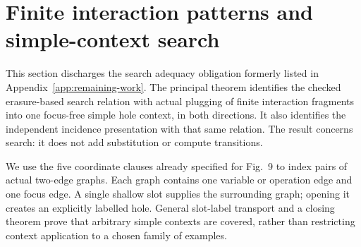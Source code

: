 \section{Finite interaction patterns and simple-context search}
\label{sec:contextual-search}
This section discharges the search adequacy obligation formerly listed in
Appendix~\ref{app:remaining-work}. The principal theorem identifies the checked
erasure-based search relation with actual plugging of finite interaction
fragments into one focus-free simple hole context, in both directions. It also
identifies the independent incidence presentation with that same relation.
The result concerns search: it does not add substitution or compute transitions.

We use the five coordinate clauses already specified for Fig.~9 to index pairs
of actual two-edge graphs. Each graph contains one variable or operation edge
and one focus edge. A single shallow slot supplies the surrounding graph;
opening it creates an explicitly labelled hole. General slot-label transport
and a closing theorem prove that arbitrary simple contexts are covered, rather
than restricting context application to a chosen family of examples.

